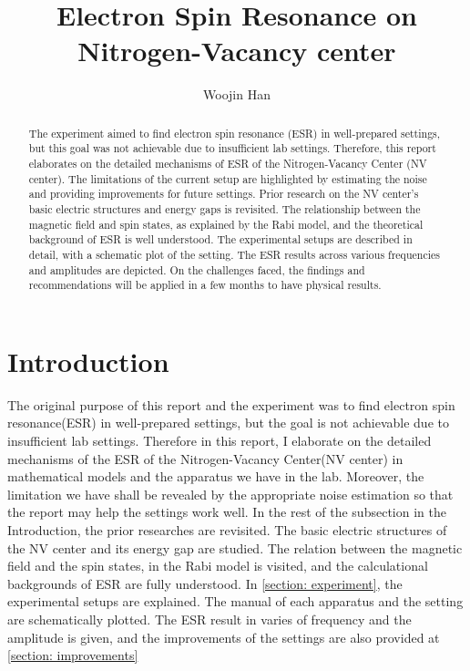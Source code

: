 \documentclass{article}
\begin{document}
\title{Electron Spin Resonance on Nitrogen-Vacancy center}
\author[1]{Woojin Han}
\maketitle

\begin{abstract}
    The experiment aimed to find electron spin resonance (ESR) in well-prepared settings, but this goal was not achievable due to insufficient lab settings.
    Therefore, this report elaborates on the detailed mechanisms of ESR of the Nitrogen-Vacancy Center (NV center).
    The limitations of the current setup are highlighted by estimating the noise and providing improvements for future settings.
    Prior research on the NV center's basic electric structures and energy gaps is revisited.
    The relationship between the magnetic field and spin states, as explained by the Rabi model, and the theoretical background of ESR is well understood.
    The experimental setups are described in detail, with a schematic plot of the setting.
    The ESR results across various frequencies and amplitudes are depicted.
    On the challenges faced, the findings and recommendations will be applied in a few months to have physical results.
\end{abstract}

\section{Introduction}
The original purpose of this report and the experiment was to find electron spin resonance(ESR) in well-prepared settings, but the goal is not achievable due to insufficient lab settings.
Therefore in this report, I elaborate on the detailed mechanisms of the ESR of the Nitrogen-Vacancy Center(NV center) in mathematical models and the apparatus we have in the lab.
Moreover, the limitation we have shall be revealed by the appropriate noise estimation so that the report may help the settings work well.
In the rest of the subsection in the Introduction, the prior researches are revisited.
The basic electric structures of the NV center and its energy gap are studied.
The relation between the magnetic field and the spin states, in the Rabi model is visited, and the calculational backgrounds of ESR are fully understood.
In \ref{section: experiment}, the experimental setups are explained.
The manual of each apparatus and the setting are schematically plotted.
The ESR result in varies of frequency and the amplitude is given, and the improvements of the settings are also provided at \ref{section: improvements}
\end{document}
